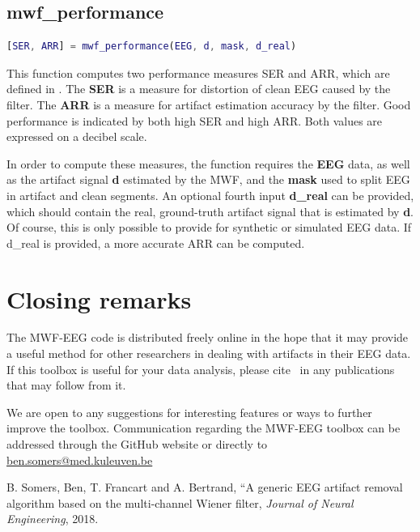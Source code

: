 \documentclass[11pt]{article}
\begin{document}
\subsection{mwf\_performance}

\begin{lstlisting}[frame=single, language=matlab]
[SER, ARR] = mwf_performance(EEG, d, mask, d_real)
\end{lstlisting}

This function computes two performance measures SER and ARR, which are defined in \cite{somers2018generic}. The \textbf{SER} is a measure for distortion of clean EEG caused by the filter. The \textbf{ARR} is a measure for artifact estimation accuracy by the filter. Good performance is indicated by both high SER and high ARR. Both values are expressed on a decibel scale.

In order to compute these measures, the function requires the \textbf{EEG} data, as well as the artifact signal \textbf{d} estimated by the MWF, and the \textbf{mask} used to split EEG in artifact and clean segments. An optional fourth input \textbf{d\_real} can be provided, which should contain the real, ground-truth artifact signal that is estimated by \textbf{d}. Of course, this is only possible to provide for synthetic or simulated EEG data. If d\_real is provided, a more accurate ARR can be computed.

\newpage
\section{Closing remarks}

The MWF-EEG code is distributed freely online in the hope that it may provide a useful method for other researchers in dealing with artifacts in their EEG data. If this toolbox is useful for your data analysis, please cite~ \cite{somers2018generic} in any publications that may follow from it.

We are open to any suggestions for interesting features or ways to further improve the toolbox. Communication regarding the MWF-EEG toolbox can be addressed through the GitHub website or directly to \href{mailto:ben.somers@med.kuleuven.be}{ben.somers@med.kuleuven.be}

\begin{thebibliography}{9}

  B. Somers, Ben, T. Francart and A. Bertrand,
  ``A generic EEG artifact removal algorithm based on the multi-channel Wiener filter, 
  \textit{Journal of Neural Engineering},
  2018.

\end{thebibliography}
\end{document}
